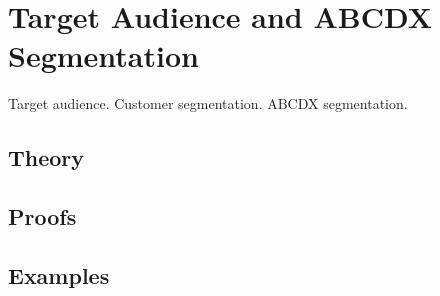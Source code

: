 
\section{Target Audience and ABCDX Segmentation}
\label{sec:2.6.01-target-audience}

\begin{ticket}
Target audience. Customer segmentation. ABCDX segmentation.
\end{ticket}

\subsection*{Theory}

\subsection*{Proofs}

\subsection*{Examples}

